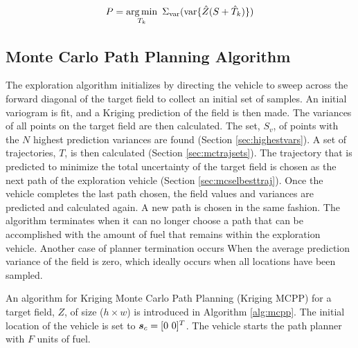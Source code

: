 \begin{equation}
	\label{eq:mcfoundpath}
	P = \argmin_{T_k}\ \Sigma_{\text{var}}(\text{var}\{\hat{Z}(S+\hat{T}_k)\})
\end{equation}

\subsection{Monte Carlo Path Planning Algorithm}
The exploration algorithm initializes by directing the vehicle to sweep across the forward diagonal of the target field to collect an initial set of samples. An initial variogram is fit, and a Kriging prediction of the field is then made. The variances of all points on the target field are then calculated. The set, $S_{v}$, of points with the $N$ highest prediction variances are found (Section \ref{sec:highestvars}). A set of trajectories, $T$, is then calculated (Section \ref{sec:mctrajsets}). The trajectory that is predicted to minimize the total uncertainty of the target field is chosen as the next path of the exploration vehicle (Section \ref{sec:mcselbesttraj}). Once the vehicle completes the last path chosen, the field values and variances are predicted and calculated again. A new path is chosen in the same fashion. The algorithm terminates when it can no longer choose a path that can be accomplished with the amount of fuel that remains within the exploration vehicle. Another case of planner termination occurs When the average prediction variance of the field is zero, which ideally occurs when all locations have been sampled.

An algorithm for Kriging Monte Carlo Path Planning (Kriging MCPP) for a target field, $Z$, of size ($h\times w$) is introduced in Algorithm \ref{alg:mcpp}. The initial location of the vehicle is set to $\vect{s}_{c} = [0\ 0]^T$. The vehicle starts the path planner with $F$ units of fuel.

